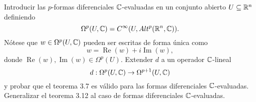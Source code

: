 \documentclass[twoside]{article}
\begin{document}
\newpage

\begin{ejercicio}{3.5}
Introducir las $p$-formas diferenciales $\mathbb{C}$-evaluadas en un conjunto abierto $U\subseteq\mathbb{R}^n$ definiendo
\[
\Omega^p(U,\mathbb{C})=C^{\infty}(U,Alt^p(\mathbb{R}^n,\mathbb{C})).
\]
Nótese que $w\in\Omega^p(U,\mathbb{C})$ pueden ser escritas de forma única como
\[
w=\operatorname{Re}(w)+i\operatorname{Im}(w),
\]
donde $\operatorname{Re}(w),\operatorname{Im}(w)\in \Omega^p(U)$. Extender $d$ a un operador $\mathbb{C}$-lineal 
\[
d:\Omega^p(U,\mathbb{C})\to\Omega^{p+1}(U,\mathbb{C})
\]
y probar que el teorema 3.7 es válido para las formas diferenciales $\mathbb{C}$-evaluadas. Generalizar el teorema 3.12 al caso de formas diferenciales $\mathbb{C}$-evaluadas.
\end{ejercicio}
\begin{solucion}


\end{solucion}

\newpage

\begin{ejercicio}{3.6}

\end{ejercicio}
\begin{solucion}

\end{solucion}

\newpage

\begin{ejercicio}{3.7}

\end{ejercicio}
\begin{solucion}

\end{solucion}
\end{document}
